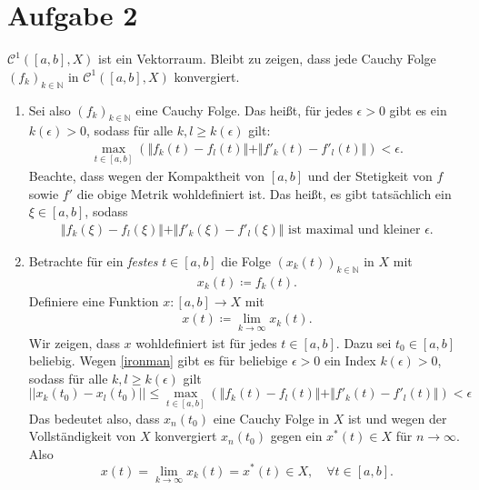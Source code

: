 \documentclass[a4paper,fontsize=8pt,DIV=1]{article}
\theoremstyle{plain}
\begin{document}
\section*{Aufgabe 2}
$\mathcal C^1([a,b], X)$ ist ein Vektorraum. Bleibt zu zeigen, dass jede Cauchy Folge $(f_k)_{k \in \mathbb N}$ in $\mathcal C^1([a,b], X)$ konvergiert. 
\begin{enumerate}
	\item Sei also $(f_k)_{k \in \mathbb N}$ eine Cauchy Folge. Das heißt, für jedes $\epsilon > 0$ gibt es ein $k(\epsilon) > 0$, sodass für alle $k,l \geq k(\epsilon)$ gilt:
	\begin{align}\label{ironman}
		\max_{t \in [a,b]} (\Vert f_k(t)- f_l(t) \Vert + \Vert f'_k(t) - f'_l(t) \Vert) < \epsilon.
	\end{align}
	Beachte, dass wegen der Kompaktheit von $[a,b]$ und der Stetigkeit von $f$ sowie $f'$ die obige Metrik wohldefiniert ist. Das heißt, es gibt tatsächlich ein $\xi \in [a,b]$, sodass 
	\begin{align}\label{noob}
		\Vert f_k(\xi)- f_l(\xi) \Vert + \Vert f'_k(\xi) - f'_l(\xi) \Vert \text{ ist maximal und kleiner $\epsilon$}.
	\end{align}
	
	\item Betrachte für ein \emph{festes} $t \in [a,b]$ die Folge $(x_k(t))_{k \in \mathbb N}$ in $X$ mit
	\begin{align*}
	x_k(t) \coloneqq f_k(t).
	\end{align*}
	Definiere eine Funktion $x: [a,b] \to X$ mit
	\begin{align*}
		x(t) \coloneqq \lim_{k\to \infty}x_k(t).
	\end{align*}
	Wir zeigen, dass $x$ wohldefiniert ist für jedes $t \in [a,b]$. Dazu 
	sei $t_0 \in [a,b]$ beliebig. Wegen \eqref{ironman} gibt es für beliebige $\epsilon > 0$ ein Index $k(\epsilon) > 0$, sodass für alle $k,l \geq k(\epsilon)$ gilt
	\[
		||x_k(t_0) - x_l(t_0)|| \leq \max_{t \in [a,b]} (\Vert f_k(t)- f_l(t) \Vert + \Vert f'_k(t) - f'_l(t) \Vert) < \epsilon
	\]
	Das bedeutet also, dass $x_n(t_0)$ eine Cauchy Folge in $X$ ist und wegen der Vollständigkeit von $X$ konvergiert $x_n(t_0)$ gegen ein $x^{*}(t) \in X$ für $n \to \infty$. Also
	\[
		x(t) = \lim_{k \to \infty} x_k(t) = x^{*}(t) \in X, \quad \forall t \in [a,b].
	\]
	

\end{enumerate}
\end{document}
